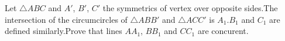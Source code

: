 Let $\triangle ABC$ and $A'$, $B'$, $C'$ the symmetrics of vertex over opposite sides.The intersection of the  circumcircles of $\triangle ABB'$ and $\triangle ACC'$ is $A_1$.$B_1$ and $C_1$ are defined similarly.Prove that lines $AA_1$, $BB_1$ and $CC_1$ are concurent.